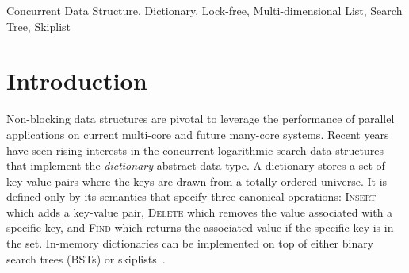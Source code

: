 \documentclass[10pt,conference,compsocconf]{IEEEtran}
\begin{document}
\begin{IEEEkeywords}
    Concurrent Data Structure, Dictionary, Lock-free, Multi-dimensional List, Search Tree, Skiplist
\end{IEEEkeywords}

\section{Introduction}\label{sec:intro}
Non-blocking data structures are pivotal to leverage the performance of parallel applications on current multi-core and future many-core systems.
Recent years have seen rising interests in the concurrent logarithmic search data structures that implement the \emph{dictionary} abstract data type.
A dictionary stores a set of key-value pairs where the keys are drawn from a totally ordered universe. 
It is defined only by its semantics that specify three canonical operations: \textsc{Insert} which adds a key-value pair, \textsc{Delete} which removes the value associated with a specific key, and \textsc{Find} which returns the associated value if the specific key is in the set.
In-memory dictionaries can be implemented on top of either binary search trees (BSTs) or skiplists~\cite{pugh1990skip}. 
\end{document}
